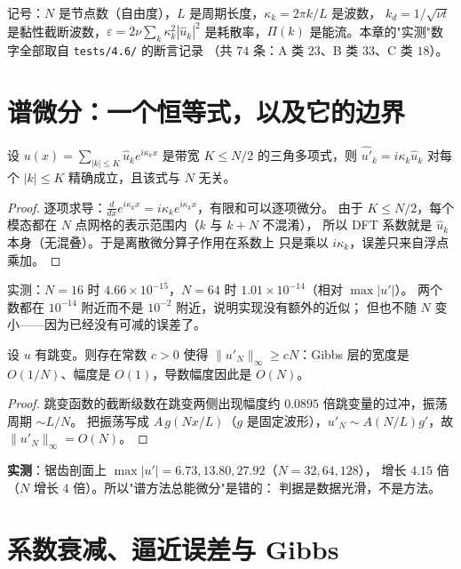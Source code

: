 记号：$N$ 是节点数（自由度），$L$ 是周期长度，$\kappa_k=2\pi k/L$ 是波数，
$k_d=1/\sqrt{\nu t}$ 是黏性截断波数，$\varepsilon=2\nu\sum_k\kappa_k^2|\hat u_k|^2$
是耗散率，$\Pi(k)$ 是能流。本章的"实测"数字全部取自 \texttt{tests/4.6/} 的断言记录
（共 $74$ 条：A 类 $23$、B 类 $33$、C 类 $18$）。

\section{谱微分：一个恒等式，以及它的边界}

\begin{theorem}[谱微分]
设 $u(x)=\sum_{|k|\le K}\hat u_k e^{i\kappa_k x}$ 是带宽 $K\le N/2$ 的三角多项式，则
$\widehat{u'}_k=i\kappa_k\hat u_k$ 对每个 $|k|\le K$ 精确成立，且该式与 $N$ 无关。
\end{theorem}

\begin{proof}
逐项求导：$\frac{d}{dx}e^{i\kappa_k x}=i\kappa_k e^{i\kappa_k x}$，有限和可以逐项微分。
由于 $K\le N/2$，每个模态都在 $N$ 点网格的表示范围内（$k$ 与 $k+N$ 不混淆），
所以 DFT 系数就是 $\hat u_k$ 本身（无混叠）。于是离散微分算子作用在系数上
只是乘以 $i\kappa_k$，误差只来自浮点乘加。
\end{proof}

\begin{corollary}
实测：$N=16$ 时 $4.66\times10^{-15}$，$N=64$ 时 $1.01\times10^{-14}$（相对 $\max|u'|$）。
两个数都在 $10^{-14}$ 附近而不是 $10^{-2}$ 附近，说明实现没有额外的近似；
但也不随 $N$ 变小——因为已经没有可减的误差了。
\end{corollary}

\begin{theorem}[间断数据的谱微分不收敛]
设 $u$ 有跳变。则存在常数 $c>0$ 使得 $\|u'_N\|_\infty\ge cN$：Gibbs 层的宽度是
$O(1/N)$、幅度是 $O(1)$，导数幅度因此是 $O(N)$。
\end{theorem}

\begin{proof}
跳变函数的截断级数在跳变两侧出现幅度约 $0.0895$ 倍跳变量的过冲，振荡周期 $\sim L/N$。
把振荡写成 $A\,g(Nx/L)$（$g$ 是固定波形），$u'_N\sim A(N/L)g'$，故 $\|u'_N\|_\infty=O(N)$。
\end{proof}

\textbf{实测}：锯齿剖面上 $\max|u'|=6.73,13.80,27.92$（$N=32,64,128$），
增长 $4.15$ 倍（$N$ 增长 $4$ 倍）。所以"谱方法总能微分"是错的：
判据是数据光滑，不是方法。

\section{系数衰减、逼近误差与 Gibbs}

